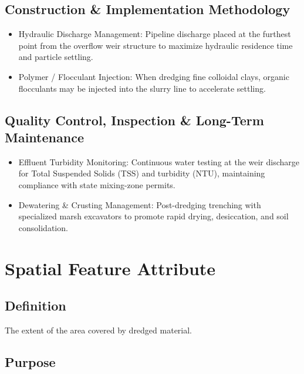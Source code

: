 \documentclass[
  letterpaper,
  DIV=11,
  numbers=noendperiod]{scrreprt}
\begin{document}
\subsection{Construction \& Implementation
Methodology}\label{construction-implementation-methodology-17}

\begin{itemize}
\item
  Hydraulic Discharge Management: Pipeline discharge placed at the
  furthest point from the overflow weir structure to maximize hydraulic
  residence time and particle settling.
\item
  Polymer / Flocculant Injection: When dredging fine colloidal clays,
  organic flocculants may be injected into the slurry line to accelerate
  settling.
\end{itemize}

\subsection{Quality Control, Inspection \& Long-Term
Maintenance}\label{quality-control-inspection-long-term-maintenance-17}

\begin{itemize}
\item
  Effluent Turbidity Monitoring: Continuous water testing at the weir
  discharge for Total Suspended Solids (TSS) and turbidity (NTU),
  maintaining compliance with state mixing-zone permits.
\item
  Dewatering \& Crusting Management: Post-dredging trenching with
  specialized marsh excavators to promote rapid drying, desiccation, and
  soil consolidation.
\end{itemize}

\section{Spatial Feature Attribute}\label{spatial-feature-attribute-12}

\subsection{Definition}\label{definition-16}

The extent of the area covered by dredged material.

\subsection{Purpose}\label{purpose-20}
\end{document}
